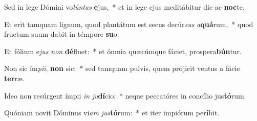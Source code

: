 \item Sed in lege Dómini vo\textit{lún}\textit{tas} \textbf{e}jus,~* et in lege ejus meditábitur die ac \textbf{noc}te.
\item Et erit tamquam lignum, quod plantátum est secus decúr\textit{sus} \textit{a}\textbf{quá}rum,~* quod fructum suum dabit in témpore \textbf{su}o:
\item Et fólium e\textit{jus} \textit{non} \textbf{dé}fluet:~* et ómnia quæcúmque fáciet, prospera\textbf{bún}tur.
\item Non sic ím\textit{pi}\textit{i}, \textbf{non} sic:~* sed tamquam pulvis, quem prójicit ventus a fácie \textbf{ter}ræ.
\item Ideo non resúrgent ímpii \textit{in} \textit{ju}\textbf{dí}cio:~* neque peccatóres in concílio jus\textbf{tó}rum.
\item Quóniam novit Dóminus vi\textit{am} \textit{jus}\textbf{tó}rum:~* et iter impiórum per\textbf{í}bit.
